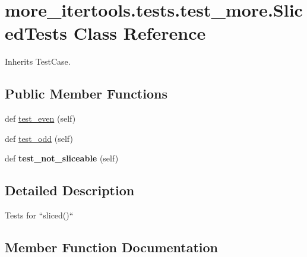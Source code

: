 \hypertarget{classmore__itertools_1_1tests_1_1test__more_1_1_sliced_tests}{}\section{more\+\_\+itertools.\+tests.\+test\+\_\+more.\+Sliced\+Tests Class Reference}
\label{classmore__itertools_1_1tests_1_1test__more_1_1_sliced_tests}


Inherits Test\+Case.

\subsection*{Public Member Functions}
\begin{DoxyCompactItemize}
\item 
def \hyperlink{classmore__itertools_1_1tests_1_1test__more_1_1_sliced_tests_af8e62d056000c4c694da5e3ce65dd665}{test\+\_\+even} (self)
\item 
def \hyperlink{classmore__itertools_1_1tests_1_1test__more_1_1_sliced_tests_a1e7ce6b4a054c00ffc3f386bb2ca66e4}{test\+\_\+odd} (self)
\item 
\mbox{\label{classmore__itertools_1_1tests_1_1test__more_1_1_sliced_tests_a8a1d2af91d46c5c4f7046f6fb38393a0}} 
def {\bfseries test\+\_\+not\+\_\+sliceable} (self)
\end{DoxyCompactItemize}


\subsection{Detailed Description}
\begin{DoxyVerb}Tests for ``sliced()``\end{DoxyVerb}
 

\subsection{Member Function Documentation}
\mbox{\label{classmore__itertools_1_1tests_1_1test__more_1_1_sliced_tests_af8e62d056000c4c694da5e3ce65dd665}} 
